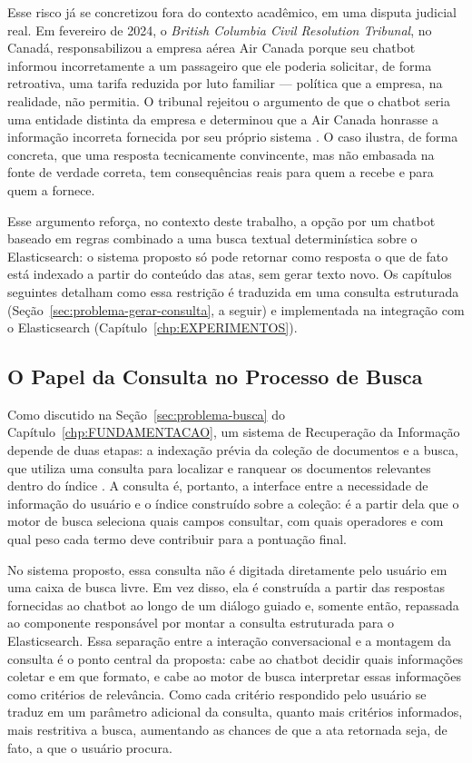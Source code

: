 Esse risco já se concretizou fora do contexto acadêmico, em uma disputa judicial real. Em fevereiro de 2024, o \textit{British Columbia Civil Resolution Tribunal}, no Canadá, responsabilizou a empresa aérea Air Canada porque seu chatbot informou incorretamente a um passageiro que ele poderia solicitar, de forma retroativa, uma tarifa reduzida por luto familiar — política que a empresa, na realidade, não permitia. O tribunal rejeitou o argumento de que o chatbot seria uma entidade distinta da empresa e determinou que a Air Canada honrasse a informação incorreta fornecida por seu próprio sistema \cite{aircanada-cbc, aircanada-aba}. O caso ilustra, de forma concreta, que uma resposta tecnicamente convincente, mas não embasada na fonte de verdade correta, tem consequências reais para quem a recebe e para quem a fornece.

Esse argumento reforça, no contexto deste trabalho, a opção por um chatbot baseado em regras combinado a uma busca textual determinística sobre o Elasticsearch: o sistema proposto só pode retornar como resposta o que de fato está indexado a partir do conteúdo das atas, sem gerar texto novo. Os capítulos seguintes detalham como essa restrição é traduzida em uma consulta estruturada (Seção~\ref{sec:problema-gerar-consulta}, a seguir) e implementada na integração com o Elasticsearch (Capítulo~\ref{chp:EXPERIMENTOS}).

\subsection{O Papel da Consulta no Processo de Busca}

Como discutido na Seção~\ref{sec:problema-busca} do Capítulo~\ref{chp:FUNDAMENTACAO}, um sistema de Recuperação da Informação depende de duas etapas: a indexação prévia da coleção de documentos e a busca, que utiliza uma consulta para localizar e ranquear os documentos relevantes dentro do índice \cite{manning2008ir}. A consulta é, portanto, a interface entre a necessidade de informação do usuário e o índice construído sobre a coleção: é a partir dela que o motor de busca seleciona quais campos consultar, com quais operadores e com qual peso cada termo deve contribuir para a pontuação final.

No sistema proposto, essa consulta não é digitada diretamente pelo usuário em uma caixa de busca livre. Em vez disso, ela é construída a partir das respostas fornecidas ao chatbot ao longo de um diálogo guiado e, somente então, repassada ao componente responsável por montar a consulta estruturada para o Elasticsearch. Essa separação entre a interação conversacional e a montagem da consulta é o ponto central da proposta: cabe ao chatbot decidir quais informações coletar e em que formato, e cabe ao motor de busca interpretar essas informações como critérios de relevância. Como cada critério respondido pelo usuário se traduz em um parâmetro adicional da consulta, quanto mais critérios informados, mais restritiva a busca, aumentando as chances de que a ata retornada seja, de fato, a que o usuário procura.

